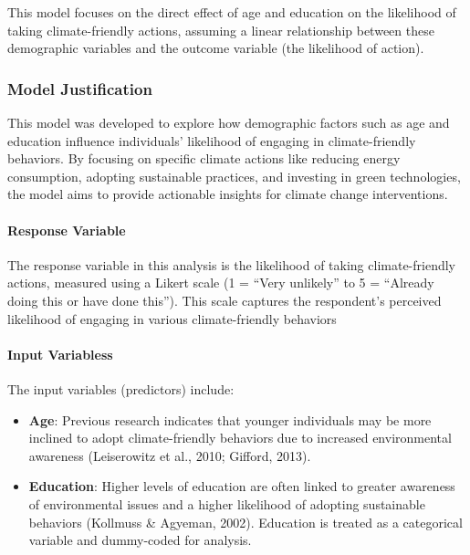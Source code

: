 \documentclass[
  letterpaper,
  DIV=11,
  numbers=noendperiod]{scrartcl}
\let\oldparagraph\paragraph
\renewcommand{\paragraph}[1]{\oldparagraph{#1}\mbox{}}
\providecommand{\tightlist}{%
  \setlength{\itemsep}{0pt}\setlength{\parskip}{0pt}}\usepackage{longtable,booktabs,array}
\begin{document}
This model focuses on the direct effect of age and education on the
likelihood of taking climate-friendly actions, assuming a linear
relationship between these demographic variables and the outcome
variable (the likelihood of action).

\subsubsection{Model Justification}\label{model-justification}

This model was developed to explore how demographic factors such as age
and education influence individuals' likelihood of engaging in
climate-friendly behaviors. By focusing on specific climate actions like
reducing energy consumption, adopting sustainable practices, and
investing in green technologies, the model aims to provide actionable
insights for climate change interventions.

\paragraph{Response Variable}\label{response-variable}

The response variable in this analysis is the likelihood of taking
climate-friendly actions, measured using a Likert scale (1 = ``Very
unlikely'' to 5 = ``Already doing this or have done this''). This scale
captures the respondent's perceived likelihood of engaging in various
climate-friendly behaviors

\paragraph{Input Variabless}\label{input-variabless}

The input variables (predictors) include:

\begin{itemize}
\tightlist
\item
  \textbf{Age}: Previous research indicates that younger individuals may
  be more inclined to adopt climate-friendly behaviors due to increased
  environmental awareness (Leiserowitz et al., 2010; Gifford, 2013).
\item
  \textbf{Education}: Higher levels of education are often linked to
  greater awareness of environmental issues and a higher likelihood of
  adopting sustainable behaviors (Kollmuss \& Agyeman, 2002). Education
  is treated as a categorical variable and dummy-coded for analysis.
\end{itemize}
\end{document}
